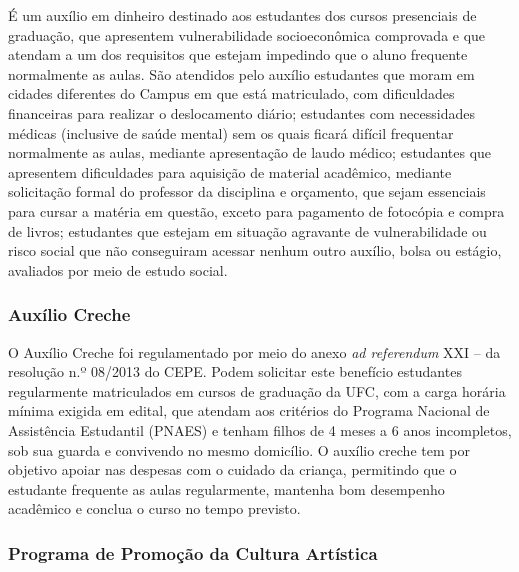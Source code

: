 É um auxílio em dinheiro destinado aos estudantes dos cursos presenciais de graduação, que apresentem vulnerabilidade socioeconômica comprovada e que atendam a um dos requisitos que estejam impedindo que o aluno frequente normalmente as aulas. São atendidos pelo auxílio estudantes que moram em cidades diferentes do Campus  em que está matriculado, com dificuldades financeiras para realizar o  deslocamento diário;  estudantes com necessidades médicas (inclusive de saúde mental) sem os quais ficará difícil frequentar normalmente as aulas, mediante apresentação de laudo médico; estudantes que apresentem dificuldades para aquisição de material acadêmico, mediante solicitação formal do professor da disciplina e orçamento, que sejam essenciais para cursar a matéria em questão, exceto para pagamento de fotocópia e compra de livros; estudantes que estejam em situação agravante de vulnerabilidade ou risco social que não conseguiram acessar nenhum outro auxílio, bolsa ou estágio, avaliados por meio de estudo social.

\subsubsection{Auxílio Creche}

O Auxílio Creche foi regulamentado por meio do anexo \textit{ad referendum} XXI – da resolução n.º 08/2013 do CEPE. Podem solicitar este benefício estudantes regularmente matriculados em cursos de graduação da UFC, com a carga horária mínima exigida em edital, que atendam aos critérios do Programa Nacional de Assistência Estudantil (PNAES) e tenham filhos de 4 meses a 6 anos incompletos, sob sua guarda e convivendo no mesmo domicílio. O auxílio creche tem por objetivo apoiar nas despesas com o cuidado da criança, permitindo que o estudante frequente as aulas regularmente, mantenha bom desempenho acadêmico e conclua o curso no tempo previsto.



\subsubsection{Programa de Promoção da Cultura Artística}


